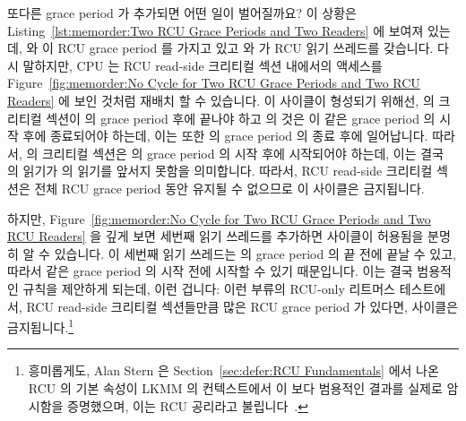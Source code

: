 또다른 grace period 가 추가되면 어떤 일이 벌어질까요?
이 상황은
Listing~\ref{lst:memorder:Two RCU Grace Periods and Two Readers} 에 보여져
있는데,  와  이 RCU grace period 를 가지고 있고  와
 가 RCU 읽기 쓰레드를 갖습니다.
다시 말하지만, CPU 는 RCU read-side 크리티컬 섹션 내에서의 액세스를
Figure~\ref{fig:memorder:No Cycle for Two RCU Grace Periods and Two RCU Readers}
에 보인 것처럼 재배치 할 수 있습니다.
이 사이클이 형성되기 위해선,  의 크리티컬 섹션이  의 grace
period  후에 끝나야 하고  의 것은 이 같은 grace period 의 시작 후에
종료되어야 하는데, 이는 또한  의 grace period 의 종료 후에 일어납니다.
따라서,  의 크리티컬 섹션은  의 grace period 의 시작 후에
시작되어야 하는데, 이는 결국  의  읽기가  의 읽기를
앞서지 못함을 의미합니다.
따라서, RCU read-side 크리티컬 섹션은 전체 RCU grace period 동안 유지될 수
없으므로 이 사이클은 금지됩니다.

하지만,
Figure~\ref{fig:memorder:No Cycle for Two RCU Grace Periods and Two RCU Readers}
을 깊게 보면 세번째 읽기 쓰레드를 추가하면 사이클이 허용됨을 분명히 알 수
있습니다.
이 세번째 읽기 쓰레드는  의 grace period 의 끝 전에 끝날 수 있고,
따라서 같은 grace period 의 시작 전에 시작할 수 있기 때문입니다.
이는 결국 범용적인 규칙을 제안하게 되는데, 이런 겁니다:  이런 부류의 RCU-only
리트머스 테스트에서, RCU read-side 크리티컬 섹션들만큼 많은 RCU grace period 가
있다면, 사이클은 금지됩니다.\footnote{
	흥미롭게도, Alan Stern 은 Section~\ref{sec:defer:RCU Fundamentals} 에서
	나온 RCU 의 기본 속성이 LKMM 의 컨텍스트에서 이 보다 범용적인 결과를
	실제로 암시함을 증명했으며, 이는 RCU 공리라고
	불립니다~\cite{Alglave:2018:FSC:3173162.3177156}.}
\iffalse

